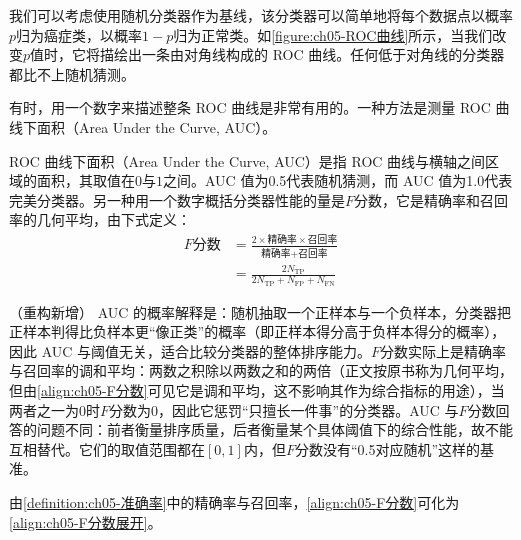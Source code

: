 \documentclass[../../main.tex]{subfiles}
\begin{document}
我们可以考虑使用随机分类器作为基线，该分类器可以简单地将每个数据点以概率$p$归为癌症类，以概率$1-p$归为正常类。如\cref{figure:ch05-ROC曲线}所示，当我们改变$p$值时，它将描绘出一条由对角线构成的 ROC 曲线。任何低于对角线的分类器都比不上随机猜测。

有时，用一个数字来描述整条 ROC 曲线是非常有用的。一种方法是测量 ROC 曲线下面积（Area Under the Curve, AUC）。

\begin{definition}[AUC 与 $F$ 分数]\label{definition:ch05-AUC与F分数}
ROC 曲线下面积（Area Under the Curve, AUC）是指 ROC 曲线与横轴之间区域的面积，其取值在$0$与$1$之间。AUC 值为0.5代表随机猜测，而 AUC 值为1.0代表完美分类器。另一种用一个数字概括分类器性能的量是$F$分数，它是精确率和召回率的几何平均，由下式定义：
\begin{align}
  F\text{分数}&=\frac{2\times\text{精确率}\times\text{召回率}}{\text{精确率}+\text{召回率}}
  \label{align:ch05-F分数}\\
  &=\frac{2N_{\mathrm{TP}}}{2N_{\mathrm{TP}}+N_{\mathrm{FP}}+N_{\mathrm{FN}}}
  \label{align:ch05-F分数展开}
\end{align}
\end{definition}

\begin{remark}（重构新增）
AUC 的概率解释是：随机抽取一个正样本与一个负样本，分类器把正样本判得比负样本更“像正类”的概率（即正样本得分高于负样本得分的概率），因此 AUC 与阈值无关，适合比较分类器的整体排序能力。$F$分数实际上是精确率与召回率的调和平均：两数之积除以两数之和的两倍（正文按原书称为几何平均，但由\eqref{align:ch05-F分数}可见它是调和平均，这不影响其作为综合指标的用途），当两者之一为0时$F$分数为0，因此它惩罚“只擅长一件事”的分类器。AUC 与$F$分数回答的问题不同：前者衡量排序质量，后者衡量某个具体阈值下的综合性能，故不能互相替代。它们的取值范围都在$[0,1]$内，但$F$分数没有“0.5对应随机”这样的基准。
\end{remark}

\begin{proposition}[$F$ 分数的显式形式]\label{proposition:ch05-F分数}
由\cref{definition:ch05-准确率}中的精确率与召回率，\eqref{align:ch05-F分数}可化为\eqref{align:ch05-F分数展开}。
\end{proposition}
\end{document}

